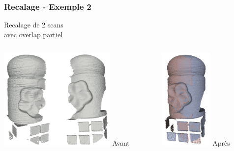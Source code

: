 \documentclass{beamer}
\begin{document}
\begin{frame}
\frametitle{Recalage - Exemple 2}
	\center Recalage de 2 scans { \footnotesize \cite{Mati2011} }
		\\ avec overlap partiel
	\vspace{5mm}
	\begin{columns}
	\begin{column}[T]{.6\textwidth}
		\includegraphics[height=5cm]{pre_reg2.png}
		\center \Large{Avant}
	\end{column}
	\begin{column}[T]{.3\textwidth}
		\includegraphics[height=5cm]{post_reg2.png}
		\center \Large{Après}
	\end{column}
	\end{columns}
\end{frame}
\end{document}
